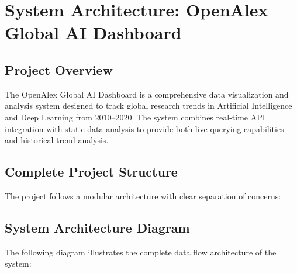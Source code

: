 \section{System Architecture: OpenAlex Global AI Dashboard}

\subsection{Project Overview}

The OpenAlex Global AI Dashboard is a comprehensive data visualization and analysis system designed to track global research trends in Artificial Intelligence and Deep Learning from 2010--2020. The system combines real-time API integration with static data analysis to provide both live querying capabilities and historical trend analysis.

\subsection{Complete Project Structure}

The project follows a modular architecture with clear separation of concerns:

\subsection{System Architecture Diagram}

The following diagram illustrates the complete data flow architecture of the system:

